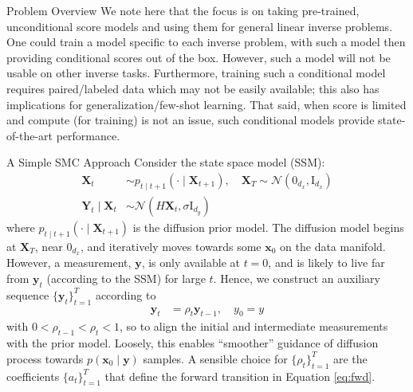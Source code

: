 \documentclass[final]{beamer}
\newlength{\colwidth}
\begin{document}
\begin{frame}[t]
\begin{columns}[t]
\begin{column}{\colwidth}
\begin{block}{Problem Overview}
        We note here that the focus is on taking pre-trained, unconditional score models and using
        them for general linear inverse problems. One could train a model specific to
        each inverse problem, with such a model then providing conditional scores out of the box.
        However, such a model will not be usable on other inverse tasks.
        Furthermore, training such a conditional model requires paired/labeled data
        which may not be easily available; this also has implications for generalization/few-shot
        learning. That said, when score is limited and compute (for training) is not an issue,
        such conditional models provide state-of-the-art performance.

    \end{block}

    \begin{alertblock}{A Simple SMC Approach}
        Consider the state space model (SSM):
        \begin{align*}
        \mathbf{X}_t &\sim p_{t \mid t+1}(\cdot \mid \mathbf{X}_{t+1}),\quad
        \mathbf{X}_T \sim \mathcal{N}(0_{d_x}, \mathrm{I}_{d_x}) \\
        \mathbf{Y}_t \mid \mathbf{X}_t &\sim \mathcal{N}(H\mathbf{X}_t, \sigma \mathrm{I}_{d_y})
        \end{align*}
        where $p_{t \mid t+1}(\cdot \mid \mathbf{X}_{t+1})$ is the diffusion prior model.
        The diffusion model begins at $\mathbf{X}_T$, near $0_{d_x}$, and iteratively moves
        towards some $\mathbf{x}_0$ on the data manifold.
        However, a measurement, $\mathbf{y}$, is only available at $t=0$,
        and is likely to live far from $\mathbf{y}_t$ (according to the SSM) for large $t$.
        Hence, we construct an auxiliary sequence $\{\mathbf{y}_t\}_{t=1}^T$ according to
        \begin{align*}
        \mathbf{y}_t &= \rho_t \mathbf{y}_{t-1},\quad y_0 = y
        \end{align*}
        with $0 < \rho_{t-1} < \rho_t < 1$, so to align the initial and intermediate measurements with the prior model.
        Loosely, this enables ``smoother'' guidance of diffusion process towards $p(\mathbf{x}_0 \mid \mathbf{y})$
        samples. A sensible choice for $\{\rho_t\}_{t=1}^T$ are the coefficients $\{a_t\}_{t=1}^T$ that define
        the forward transition in Equation \ref{eq:fwd}.


\end{alertblock}
\end{column}
\end{columns}
\end{frame}
\end{document}
